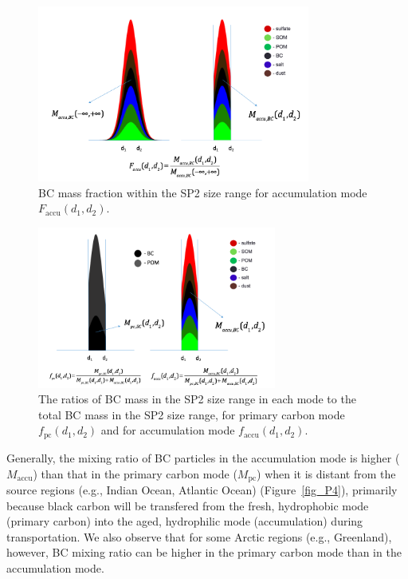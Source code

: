 \documentclass[11pt]{article}
\begin{document}
	\begin{figure}[!h] 
		\begin{center}
			\includegraphics[width = 0.8\textwidth]{Rplot06}
			\caption[]{\label{fig_P2} BC mass fraction within the SP2 size range for accumulation mode $F_{\text{accu}}(d_{1}, d_{2})$.}
		\end{center}
	\end{figure}
	
	\begin{figure}[!h] 
		\begin{center}
			\includegraphics[width = 0.7\textwidth]{Rplot07}
			\caption[]{\label{fig_P3} The ratios of BC mass in the SP2 size range in each mode to the total BC mass in the SP2 size range, for primary carbon mode $f_{\text{pc}}(d_{1}, d_{2})$ and for accumulation mode $f_{\text{accu}}(d_{1}, d_{2})$.}
		\end{center}
	\end{figure}
	
	
	Generally, the mixing ratio of BC particles in the accumulation mode is higher ($M_{\text{accu}}$) than that in the primary carbon mode ($M_{\text{pc}}$) when it is distant from the source regions (e.g., Indian Ocean, Atlantic Ocean) (Figure~\ref{fig_P4}), primarily because black carbon will be transfered from the fresh, hydrophobic mode (primary carbon) into the aged, hydrophilic mode (accumulation) during transportation. We also observe that for some Arctic regions (e.g., Greenland), however, BC mixing ratio can be higher in the primary carbon mode than in the accumulation mode.
	
\end{document}
